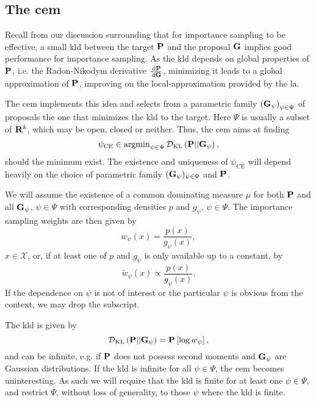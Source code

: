 \subsection{The \texorpdfstring{\Acrfull{cem}}{Cross-Entropy method}}
\label{subsec:cem}
Recall from our discussion surrounding  that for importance sampling to be effective, a small \acrshort{kld} between the target $\P$ and the proposal $\G$ implies good performance for importance sampling. As the \acrshort{kld} depends on global properties of $\P$, i.e. the Radon-Nikodym derivative $\rnd{\P}{\G}$, minimizing it leads to a global approximation of $\P$, improving on the local-approximation provided by the \acrshort{la}.

The \gls{cem} \citep{Rubinstein1999CrossEntropy,Rubinstein2004CrossEntropy} implements this idea and selects from a parametric family $ \left( \G_{\psi} \right)_{\psi \in \Psi}$ of proposals the one that minimizes the \gls{kld} to the target. Here $\Psi$ is usually a subset of $\R^{k}$, which may be open, closed or neither. Thus, the \acrshort{cem} aims at finding
$$
    \pce \in \argmin_{\psi \in \Psi} \Dkl{\P}{\G_{\psi}},
$$
should the minimum exist. The existence and uniqueness of $\psi_{\text{CE}}$ will depend heavily on the choice of parametric family $(\G_{\psi})_{\psi \in \Psi}$ and $\P$. 

We will assume the existence of a common dominating measure $\mu$ for both $\P$ and all $\G_{\psi}$, $\psi \in \Psi$ with corresponding densities $p$ and $g_{\psi}$, $\psi \in \Psi$. The importance sampling weights are then given by 
$$
w_{\psi}(x) = \frac{p(x)}{g_{\psi}(x)},
$$
$x \in \mathcal X$, or, if at least one of $p$ and $g_\psi$ is only available up to a constant, by 
$$
\tilde w_{\psi} (x) \propto \frac{p(x)}{g_{\psi}(x)}.
$$
If the dependence on $\psi$ is not of interest or the particular $\psi$ is obvious from the context, we may drop the subscript. 

The \acrshort{kld} is given by 
$$
    \Dkl{\P}{\G_{\psi}} = \P \left[ \log w_{\psi} \right],
$$
and can be infinite, e.g. if $\P$ does not possess second moments and $\G_{\psi}$ are Gaussian distributions. If the \acrshort{kld} is infinite for all $\psi\in\Psi$, the \acrshort{cem} becomes uninteresting. As such we will require that the \acrshort{kld} is finite for at least one $\psi \in \Psi$, and restrict $\Psi$, without loss of generality, to those $\psi$ where the \acrshort{kld} is finite. 

